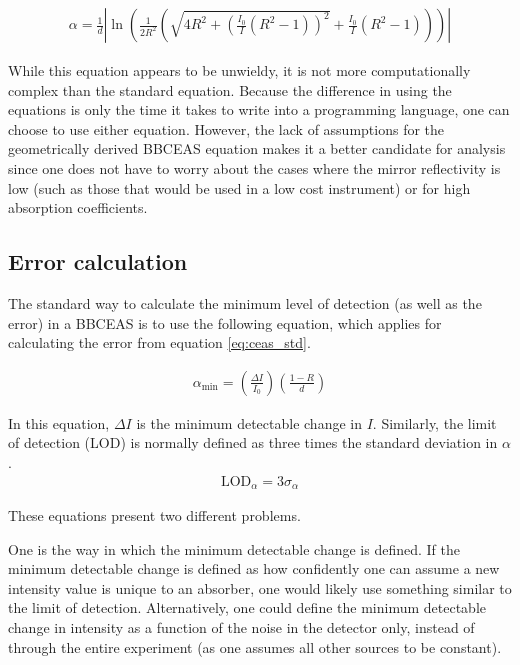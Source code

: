   \begin{align}
    \alpha = \frac{1}{d}\left|\ln\left(\frac{1}{2R^2}\left(\sqrt{4R^2+\left(\frac{I_0}{I}(R^2-1)\right)^2} + \frac{I_0}{I}(R^2-1)\right)\right)\right| \label{eq:ceas_geo}
  \end{align}

While this equation appears to be unwieldy, it is not more computationally
complex than the standard equation. Because the difference in using the
equations is only the time it takes to write into a programming language,
one can choose to use either equation. However, the lack of assumptions for
the geometrically derived \ac{BBCEAS} equation makes it a better candidate
for analysis since one does not have to worry about the cases where the
mirror reflectivity is low (such as those that would be used in a low cost
instrument) or for high absorption coefficients.

\subsection{Error calculation}\label{sec:ceas_error}


The standard way to calculate the minimum level of detection (as well as the
error) in a \ac{BBCEAS} is to use the following equation, which applies for
calculating the error from equation \eqref{eq:ceas_std}.

\begin{align}
  \alpha_{\text{min}} = \left(\frac{\Delta
  I}{I_0}\right)\left(\frac{1-R}{d}\right)\label{eq:ceas_min}
\end{align}

In this equation, $\Delta I$ is the minimum detectable change in $I$.
Similarly, the limit of detection (LOD) is normally defined as three times the
standard deviation in $\alpha$.
\begin{align}
  \text{LOD}_{\alpha} = 3\sigma_{\alpha}\label{eq:lod}
\end{align}

These equations present two different problems.

One is the way in which the minimum detectable change is defined. If the
minimum detectable change is defined as how confidently one can assume a new
intensity value is unique to an absorber, one would likely use something
similar to the limit of detection. Alternatively, one could define the minimum
detectable change in intensity as a function of the noise in the detector
only, instead of through the entire experiment (as one assumes all other
sources to be constant).

